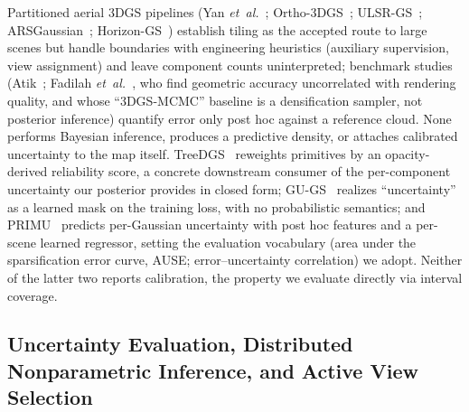  Partitioned aerial 3DGS pipelines (Yan
\emph{et~al.}~\cite{yan2025aerial}; Ortho-3DGS~\cite{ortho3dgs2025};
ULSR-GS~\cite{ulsrgs2024};
ARSGaussian~\cite{arsgaussian2026};
Horizon-GS~\cite{horizongs2025}) establish tiling as the accepted route
to large scenes but handle boundaries with engineering heuristics
(auxiliary supervision, view assignment) and leave component counts
uninterpreted; benchmark studies (Atik~\cite{atik2025benchmark};
Fadilah \emph{et~al.}~\cite{fadilah2026benchmark}, who find geometric
accuracy uncorrelated with rendering quality, and whose ``3DGS-MCMC''
baseline is a densification sampler, not posterior inference) quantify
error only post hoc against a reference cloud. None performs Bayesian
inference, produces a predictive density, or attaches calibrated
uncertainty to the map itself. TreeDGS~\cite{treedgs2026} reweights
primitives by an opacity-derived reliability score, a concrete
downstream consumer of the per-component uncertainty our posterior
provides in closed form; GU-GS~\cite{ding2026gugs} realizes
``uncertainty'' as a learned mask on the training loss, with no
probabilistic semantics; and PRIMU~\cite{gottwald2025primu} predicts
per-Gaussian uncertainty with post hoc features and a per-scene
learned regressor, setting the evaluation vocabulary (area under the
sparsification error curve, AUSE; error--uncertainty
correlation) we adopt. Neither of the latter two
reports calibration, the property we evaluate directly via interval
coverage.

\subsection{Uncertainty Evaluation, Distributed Nonparametric
Inference, and Active View Selection}
\label{sec:related-eval}


